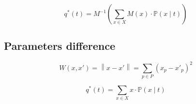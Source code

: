 \begin{equation*}
  q^* \left( t \right)
  = M^{-1} \left(
      \sum_{x \in X} M\left( x \right) \cdot \mathbb{P}\left( x \mid t \right)
    \right)
\end{equation*}

\subsection{Parameters difference}

\begin{equation*}
  W \left( x, x' \right)
  = \left\| x - x' \right\|
  = \sum_{p \in P} \left( x_p - x'_p \right)^2
\end{equation*}

\begin{equation*}
  q^* \left( t \right)
  = \sum_{x \in X} x \cdot \mathbb{P}\left( x \mid t \right)
\end{equation*}
